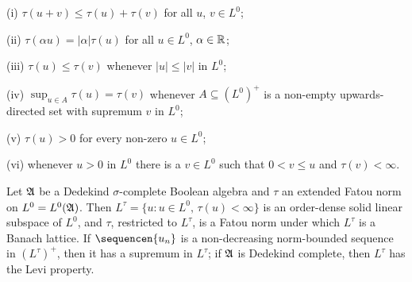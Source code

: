 (i) $\tau(u+v)\le\tau(u)+\tau(v)$ for all $u$, $v\in L^0$;
     
(ii) $\tau(\alpha u)=|\alpha|\tau(u)$ for all $u\in L^0$, 
$\alpha\in\Bbb R$;
     
(iii) $\tau(u)\le\tau(v)$ whenever $|u|\le|v|$ in $L^0$;
     
(iv) $\sup_{u\in A}\tau(u)=\tau(v)$ whenever $A\subseteq (L^0)^+$ is a
non-empty upwards-directed set with supremum $v$ in $L^0$;
     
(v) $\tau(u)>0$ for every non-zero $u\in L^0$;
     
(vi) whenever $u>0$ in $L^0$ there is a $v\in L^0$ such that $0<v\le u$
and $\tau(v)<\infty$.
     
 Let $\frak A$ be a Dedekind
$\sigma$-complete Boolean algebra and $\tau$ an extended Fatou norm on
$L^0=L^0(\frak A)$.
Then $L^{\tau}=\{u:u\in L^0,\,\tau(u)<\infty\}$ is an order-dense solid
linear subspace of $L^0$, and $\tau$, restricted to $L^{\tau}$, is a
Fatou norm under which $L^{\tau}$ is a Banach lattice.   If
$\sequencen{u_n}$ is a non-decreasing norm-bounded sequence in
$(L^{\tau})^+$, then it has a supremum in $L^{\tau}$;  if
$\frak A$ is Dedekind complete, then $L^{\tau}$ has the Levi property.
     
